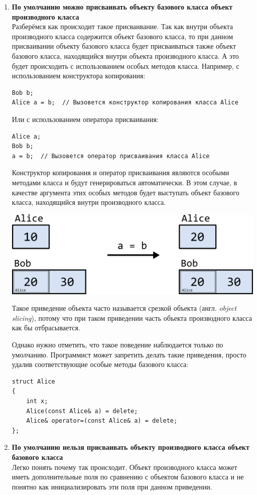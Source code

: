 \documentclass{article}
\begin{document}
\begin{enumerate}
\item \textbf{По умолчанию можно присваивать объекту базового класса объект производного класса}\\
Разберёмся как происходит такое присваивание. Так как внутри объекта производного класса содержится объект базового класса, то при данном присваивании объекту базового класса будет присваиваться также объект базового класса, находящийся внутри объекта производного класса. А это будет происходить с использованием особых методов класса. Например, с использованием конструктора копирования: 
\begin{lstlisting}
Bob b;
Alice a = b;  // Вызовется конструктор копирования класса Alice
\end{lstlisting}
Или с использованием оператора присваивания:
\begin{lstlisting}
Alice a;
Bob b;
a = b;  // Вызовется оператор присваивания класса Alice
\end{lstlisting}
Конструктор копирования и оператор присваивания являются особыми методами класса и будут генерироваться автоматически. В этом случае, в качестве аргумента этих особых методов будет выступать объект базового класса, находящийся внутри производного класса. 
\begin{center}
\includegraphics[scale=0.9]{../images/alice_bob_slicing.png}
\end{center}
Такое приведение объекта часто называется срезкой объекта (англ. \textit{object slicing}), потому что при таком приведении часть объекта производного класса как бы отбрасывается.

Однако нужно отметить, что такое поведение наблюдается только по умолчанию. Программист может запретить делать такие приведения, просто удалив соответствующие особые методы базового класса:
\begin{lstlisting}
struct Alice
{
	int x;
	Alice(const Alice& a) = delete;
	Alice& operator=(const Alice& a) = delete;
};
\end{lstlisting}


\item \textbf{По умолчанию нельзя присваивать объекту производного класса объект базового класса}\\
Легко понять почему так происходит. Объект производного класса может иметь дополнительные поля по сравнению с объектом базового класса и не понятно как инициализировать эти поля при данном приведении.


\end{enumerate}
\end{document}
